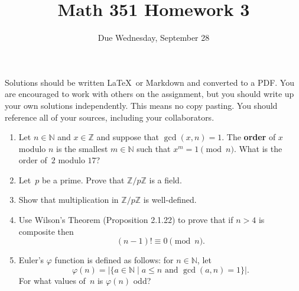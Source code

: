 \documentclass{article}
\title{Math 351 Homework 3}
\author{Due Wednesday, September 28}
\date{}
\begin{document}

\maketitle

\setlength{\parindent}{0em} %
\setlength{\parskip}{1em} %



Solutions should be written \LaTeX\ or Markdown and converted to a PDF. You are encouraged to work with others on the assignment, but you should write up your own solutions independently. This means no copy pasting. You should reference all of your sources, including your collaborators. 

\begin{enumerate}

\item Let $n \in \mathbb N$ and $x \in \mathbb Z$ and suppose that $\gcd(x, n) = 1$. The {\bf order} of $x$ modulo $n$ is the smallest $m \in \mathbb N$ such that
$x^m=1 \pmod n$. What is the order of~$2$ modulo $17$?

\item Let~$p$ be a prime.  Prove that $\mathbb Z / p \mathbb Z$ is a field.

\item Show that multiplication in $\mathbb Z / p \mathbb Z$ is well-defined. 

\item Use Wilson's Theorem (Proposition 2.1.22) to prove that if $n>4$ is composite then
	$$
	   (n-1)! \equiv 0 \pmod{n}.
	$$

\item Euler's $\varphi$ function is defined as follows: for $n \in \mathbb N$, let 
\[
  \varphi(n)=|\{a\in \mathbb N\; | \; a \leqslant n \text{ and  }\gcd(a,n)=1\}|.
\] 
For what values of~$n$ is $\varphi(n)$ odd?

\end{enumerate}
\end{document}
